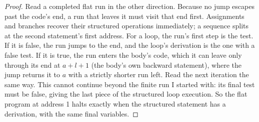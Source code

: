 \documentclass[11pt,twoside]{article}
\theoremstyle{thielethm}
\theoremstyle{thieledef}
\theoremstyle{thieledef}
\theoremstyle{thieledef}
\theoremstyle{thielethm}
\theoremstyle{thieleobs}
\theoremstyle{thielethm}
\begin{document}
\begin{proof}
Read a completed flat run in the other direction. Because no jump escapes past
the code's end, a run that leaves it must visit that end first. Assignments and
branches recover their structured operations immediately; a sequence splits at
the second statement's first address. For a
loop, the run's first step is the test. If it is false, the run jumps to the end, and the loop's
derivation is the one with a false test. If it is true, the run enters the body's code, which it
can leave only through its end at $a + l + 1$ (the body's own backward statement), where the jump
returns it to $a$ with a strictly shorter run left. Read the next iteration the same way.
This cannot continue beyond the finite run I started with: its final test must
be false, giving the last piece of the structured loop execution. So the
flat program at address 1 halts exactly when the structured statement has a derivation, with the
same final variables.


\end{proof}
\end{document}
